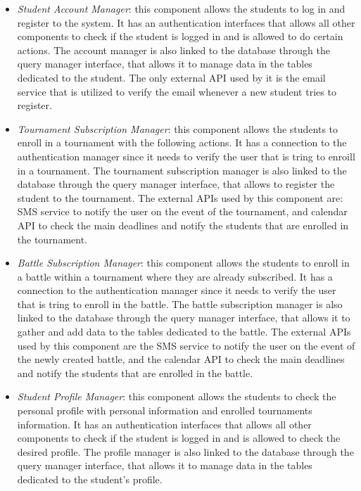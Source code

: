 \documentclass[12pt, a4paper]{report}
\begin{document}
    \begin{itemize}
        \item \textit{Student Account Manager}: this component allows the students to log in and register to the system.
            It has an authentication interfaces that allows all other components to check if the student is logged in and is allowed to do certain actions. 
            The account manager is also linked to the database through the query manager interface, that allows it to manage data in the tables dedicated to the student.
            The only external API used by it is the email service that is utilized to verify the email whenever a new student tries to register. 
        \item \textit{Tournament Subscription Manager}: this component allows the students to enroll in a tournament with the following actions.
            It has a connection to the authentication manager since it needs to verify the user that is tring to enroill in a tournament. 
            The tournament subscription manager is also linked to the database through the query manager interface, that allows to register the student to the tournament. 
            The external APIs used by this component are: SMS service to notify the user on the event of the tournament, and calendar API to check the main deadlines and notify the students that are enrolled in the tournament.
        \item \textit{Battle Subscription Manager}: this component allows the students to enroll in a battle within a tournament where they are already subscribed. 
            It has a connection to the authentication manager since it needs to verify the user that is tring to enroll in the battle. 
            The battle subscription manager is also linked to the database through the query manager interface, that allows it to gather and add data to the tables dedicated to the battle.
            The external APIs used by this component are the SMS service to notify the user on the event of the newly created battle, and the calendar API to check the main deadlines and notify the students that are enrolled in the battle.
        \item \textit{Student Profile Manager}: this component allows the students to check the personal profile with personal information and enrolled tournaments information. 
            It has an authentication interfaces that allows all other components to check if the student is logged in and is allowed to check the desired profile. 
            The profile manager is also linked to the database through the query manager interface, that allows it to manage data in the tables dedicated to the student's profile.

\end{itemize}
\end{document}
